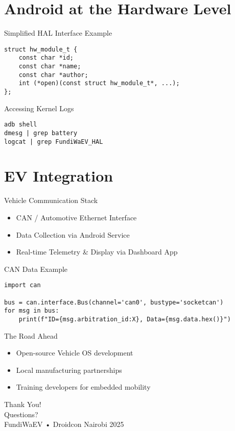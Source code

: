 \documentclass[aspectratio=169]{beamer}
\begin{document}
\section{Android at the Hardware Level}
\begin{frame}[fragile]{Simplified HAL Interface Example}
\begin{verbatim}
struct hw_module_t {
    const char *id;
    const char *name;
    const char *author;
    int (*open)(const struct hw_module_t*, ...);
};
\end{verbatim}
\end{frame}

\begin{frame}[fragile]{Accessing Kernel Logs}
\begin{verbatim}
adb shell
dmesg | grep battery
logcat | grep FundiWaEV_HAL
\end{verbatim}
\end{frame}

\section{EV Integration}
\begin{frame}{Vehicle Communication Stack}
\begin{itemize}
    \item CAN / Automotive Ethernet Interface
    \item Data Collection via Android Service
    \item Real-time Telemetry \& Display via Dashboard App
\end{itemize}
\end{frame}

\begin{frame}[fragile]{CAN Data Example}
\begin{verbatim}
import can

bus = can.interface.Bus(channel='can0', bustype='socketcan')
for msg in bus:
    print(f"ID={msg.arbitration_id:X}, Data={msg.data.hex()}")
\end{verbatim}
\end{frame}

\begin{frame}{The Road Ahead}
\begin{itemize}
    \item Open-source Vehicle OS development
    \item Local manufacturing partnerships
    \item Training developers for embedded mobility
\end{itemize}
\end{frame}

\begin{frame}
\centering
\Huge{\color{terminalgreen}Thank You!}\\[1cm]
\Large{Questions?}\\[0.5cm]
\small{\color{gray}FundiWaEV • Droidcon Nairobi 2025}
\end{frame}
\end{document}
